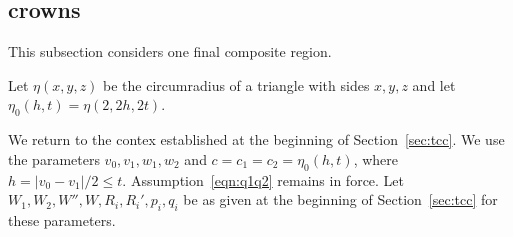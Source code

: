 %
%
%
%

\subsection{crowns}

This subsection considers
one final composite region.

Let $\eta(x,y,z)$ be the circumradius of a triangle with
sides $x,y,z$ and let $\eta_0(h,t) = \eta(2,2h,2t)$.

We return to the contex established at the beginning
of Section~\ref{sec:tcc}.  We use the parameters $v_0,v_1,w_1,w_2$
and $c=c_1=c_2=\eta_0(h,t)$, where $h =|v_0-v_1|/2 \le t$. 
Assumption~\ref{eqn:q1q2} remains in force.
Let $W_1,W_2,W'',W,R_i,R_i',p_i,q_i$ be as given at the
beginning of Section~\ref{sec:tcc} for these parameters.


